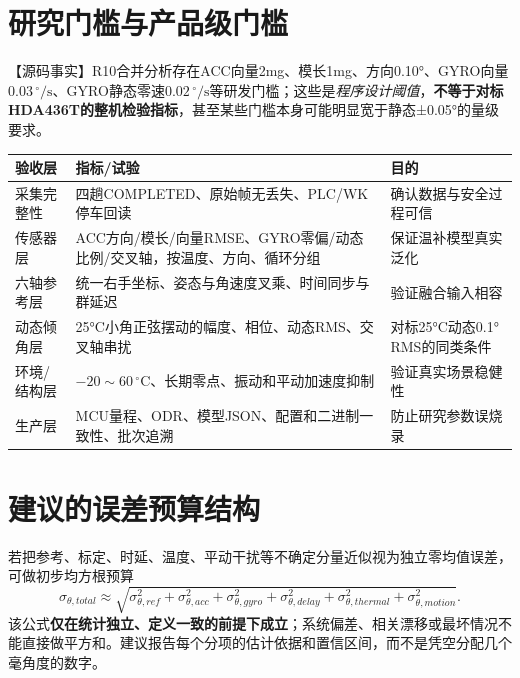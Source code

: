\documentclass[UTF8,a4paper,11pt,oneside,openany,fontset=none]{ctexbook}
\newcommand{\degc}{\,^{\circ}\mathrm C}
\newcommand{\dps}{\,^{\circ}/\mathrm s}
\begin{document}
\section{研究门槛与产品级门槛}
【源码事实】R10合并分析存在ACC向量2mg、模长1mg、方向0.10°、GYRO向量$0.03\dps$、GYRO静态零速$0.02\dps$等研发门槛；这些是\emph{程序设计阈值}，\textbf{不等于对标HDA436T的整机检验指标}，甚至某些门槛本身可能明显宽于静态±0.05°的量级要求。

\begin{longtable}{p{3.0cm}p{5.5cm}p{4.9cm}}
\toprule
验收层 & 指标/试验 & 目的\\\midrule\endhead
采集完整性 & 四趟COMPLETED、原始帧无丢失、PLC/WK停车回读 & 确认数据与安全过程可信\\
传感器层 & ACC方向/模长/向量RMSE、GYRO零偏/动态比例/交叉轴，按温度、方向、循环分组 & 保证温补模型真实泛化\\
六轴参考层 & 统一右手坐标、姿态与角速度叉乘、时间同步与群延迟 & 验证融合输入相容\\
动态倾角层 & 25°C小角正弦摆动的幅度、相位、动态RMS、交叉轴串扰 & 对标25°C动态0.1° RMS的同类条件\\
环境/结构层 & $-20\sim60\degc$、长期零点、振动和平动加速度抑制 & 验证真实场景稳健性\\
生产层 & MCU量程、ODR、模型JSON、配置和二进制一致性、批次追溯 & 防止研究参数误烧录\\\bottomrule
\end{longtable}

\section{建议的误差预算结构}
若把参考、标定、时延、温度、平动干扰等不确定分量近似视为独立零均值误差，可做初步均方根预算
\begin{equation}
\sigma_{\theta,total}\approx\sqrt{\sigma_{\theta,ref}^2+\sigma_{\theta,acc}^2+\sigma_{\theta,gyro}^2+\sigma_{\theta,delay}^2+\sigma_{\theta,thermal}^2+\sigma_{\theta,motion}^2}.
\end{equation}
该公式\textbf{仅在统计独立、定义一致的前提下成立}；系统偏差、相关漂移或最坏情况不能直接做平方和。建议报告每个分项的估计依据和置信区间，而不是凭空分配几个毫角度的数字。
\end{document}
